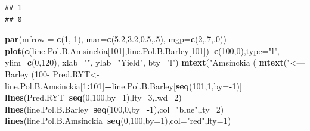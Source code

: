 \documentclass[letterpaper,]{book}
\newenvironment{Shaded}{\begin{snugshade}}{\end{snugshade}}
\newcommand{\DataTypeTok}[1]{\textcolor[rgb]{0.13,0.29,0.53}{#1}}
\newcommand{\DecValTok}[1]{\textcolor[rgb]{0.00,0.00,0.81}{#1}}
\newcommand{\FloatTok}[1]{\textcolor[rgb]{0.00,0.00,0.81}{#1}}
\newcommand{\KeywordTok}[1]{\textcolor[rgb]{0.13,0.29,0.53}{\textbf{#1}}}
\newcommand{\NormalTok}[1]{#1}
\newcommand{\OperatorTok}[1]{\textcolor[rgb]{0.81,0.36,0.00}{\textbf{#1}}}
\newcommand{\StringTok}[1]{\textcolor[rgb]{0.31,0.60,0.02}{#1}}
\begin{document}
\begin{verbatim}
## 1 
## 0
\end{verbatim}

\begin{Shaded}
\begin{Highlighting}[]
\KeywordTok{par}\NormalTok{(}\DataTypeTok{mfrow =} \KeywordTok{c}\NormalTok{(}\DecValTok{1}\NormalTok{, }\DecValTok{1}\NormalTok{), }\DataTypeTok{mar=}\KeywordTok{c}\NormalTok{(}\FloatTok{5.2}\NormalTok{,}\FloatTok{3.2}\NormalTok{,}\FloatTok{0.5}\NormalTok{,.}\DecValTok{5}\NormalTok{), }\DataTypeTok{mgp=}\KeywordTok{c}\NormalTok{(}\DecValTok{2}\NormalTok{,.}\DecValTok{7}\NormalTok{,.}\DecValTok{0}\NormalTok{))}
\KeywordTok{plot}\NormalTok{(}\KeywordTok{c}\NormalTok{(line.Pol.B.Amsinckia[}\DecValTok{101}\NormalTok{],line.Pol.B.Barley[}\DecValTok{101}\NormalTok{])}\OperatorTok{~}\KeywordTok{c}\NormalTok{(}\DecValTok{100}\NormalTok{,}\DecValTok{0}\NormalTok{),}\DataTypeTok{type=}\StringTok{"l"}\NormalTok{,}
     \DataTypeTok{ylim=}\KeywordTok{c}\NormalTok{(}\DecValTok{0}\NormalTok{,}\DecValTok{120}\NormalTok{), }\DataTypeTok{xlab=}\StringTok{""}\NormalTok{, }\DataTypeTok{ylab=}\StringTok{"Yield"}\NormalTok{, }\DataTypeTok{bty=}\StringTok{"l"}\NormalTok{)}
\KeywordTok{mtext}\NormalTok{(}\StringTok{"Amsinckia (%
\KeywordTok{mtext}\NormalTok{(}\StringTok{"<--- Barley (100-%
\NormalTok{Pred.RYT<-line.Pol.B.Amsinckia[}\DecValTok{1}\OperatorTok{:}\DecValTok{101}\NormalTok{]}\OperatorTok{+}\NormalTok{line.Pol.B.Barley[}\KeywordTok{seq}\NormalTok{(}\DecValTok{101}\NormalTok{,}\DecValTok{1}\NormalTok{,}\DataTypeTok{by=}\OperatorTok{-}\DecValTok{1}\NormalTok{)]}
\KeywordTok{lines}\NormalTok{(Pred.RYT}\OperatorTok{~}\KeywordTok{seq}\NormalTok{(}\DecValTok{0}\NormalTok{,}\DecValTok{100}\NormalTok{,}\DataTypeTok{by=}\DecValTok{1}\NormalTok{),}\DataTypeTok{lty=}\DecValTok{3}\NormalTok{,}\DataTypeTok{lwd=}\DecValTok{2}\NormalTok{)}
\KeywordTok{lines}\NormalTok{(line.Pol.B.Barley}\OperatorTok{~}\KeywordTok{seq}\NormalTok{(}\DecValTok{100}\NormalTok{,}\DecValTok{0}\NormalTok{,}\DataTypeTok{by=}\OperatorTok{-}\DecValTok{1}\NormalTok{),}\DataTypeTok{col=}\StringTok{"blue"}\NormalTok{,}\DataTypeTok{lty=}\DecValTok{2}\NormalTok{)}
\KeywordTok{lines}\NormalTok{(line.Pol.B.Amsinckia}\OperatorTok{~}\KeywordTok{seq}\NormalTok{(}\DecValTok{0}\NormalTok{,}\DecValTok{100}\NormalTok{,}\DataTypeTok{by=}\DecValTok{1}\NormalTok{),}\DataTypeTok{col=}\StringTok{"red"}\NormalTok{,}\DataTypeTok{lty=}\DecValTok{1}\NormalTok{)}
}}
\end{Highlighting}
\end{Shaded}
\end{document}
